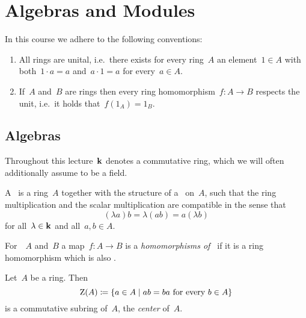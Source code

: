 \chapter{Algebras and Modules}


\begin{conventions}
  In this course we adhere to the following conventions:
  \begin{enumerate}
    \item
      All rings are unital, i.e.\ there exists for every ring~$A$ an element~$1 \in A$ with both~$1 \cdot a = a$ and~$a \cdot 1 = a$ for every~$a \in A$.
    \item
      If~$A$ and~$B$ are rings then every ring homomorphism~$f \colon A \to B$ respects the unit, i.e.\ it holds that~$f(1_A) = 1_B$.
  \end{enumerate}
\end{conventions}





\section{Algebras}


\begin{conventions}
  Throughout this lecture~$\mathbf{k}$ denotes a commutative ring, which we will often additionally assume to be a field.
\end{conventions}


\begin{definition}
  A~\emph{{\kalg}} is a ring~$A$ together with the structure of a~{\kmod} on~$A$, such that the ring multiplication and the scalar multiplication are compatible in the sense that
  \begin{equation}
    \label{compatibility of multiplications}
      (\lambda a) b
    = \lambda (ab)
    = a (\lambda b)
  \end{equation}
  for all~$\lambda \in \mathbf{k}$ and all~$a, b \in A$.
\end{definition}


\begin{definition}
  For~{\kalgs}~$A$ and~$B$ a map~$f \colon A \to B$ is a \emph{homomorphisms of~{\kalgs}} if it is a ring homomorphism which is also {\klin}.
\end{definition}


\begin{remark}
  Let~$A$ be a ring.
  Then
  \[
              \ringcenter(A)
    \defined  \{
                a \in A
              \suchthat
                \text{$ab = ba$ for every~$b \in A$}
              \}
  \]
  is a commutative subring of~$A$, the \emph{center} of~$A$.
\end{remark}


